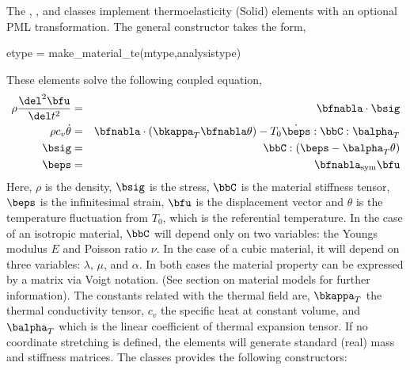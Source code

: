 The , , 
and 
classes implement thermoelasticity (Solid) elements with an optional PML
transformation. 
The general constructor takes the form,
\begin{codelist}
  \item[etype = make\_material\_te(mtype,analysistype)]
\end{codelist}
These elements solve the following coupled equation,
\begin{eqnarray}
\rho \frac{\del^2 \bfu}{\del t^2}
&=& \bfnabla\cdot\bsig \\
\rho c_v \dot{\theta} 
&=& \bfnabla\cdot\left(\bkappa_T\bfnabla \theta\right)
   - T_0 \dot{\beps}:\bbC:\balpha_T\\
\bsig &=& \bbC:\left(\beps - \balpha_T \theta \right)\\
\beps &=& \bfnabla_\text{sym}\bfu
\end{eqnarray}
Here, $\rho$ is the density, $\bsig$ is the stress, $\bbC$ is the
material stiffness tensor, $\beps$ is the infinitesimal strain, 
$\bfu$ is the displacement vector and $\theta$ is the temperature
fluctuation from $T_0$, which is the referential temperature.
In the case of an isotropic material,
$\bbC$ will depend only on two variables: the Youngs modulus $E$ and 
Poisson ratio $\nu$. In the case of a cubic material, it will depend
on three variables: $\lambda$, $\mu$, and $\alpha$.  In both cases 
the material property can be expressed by a matrix via Voigt notation. 
(See section on material models for further information). The constants
related with the thermal field are, $\bkappa_T$ the thermal conductivity
tensor, $c_v$ the specific heat at constant volume, and $\balpha_T$ which
is the linear coefficient of thermal expansion tensor. 
If no coordinate stretching is defined, the elements will generate 
standard (real) mass and stiffness matrices.
The classes provides the following constructors:
